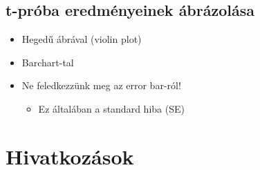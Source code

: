 \documentclass[
  letterpaper,
  DIV=11,
  numbers=noendperiod]{scrreprt}
\providecommand{\tightlist}{%
  \setlength{\itemsep}{0pt}\setlength{\parskip}{0pt}}\usepackage{longtable,booktabs,array}
\newlength{\cslhangindent}
\newlength{\cslentryspacingunit} %
\newenvironment{CSLReferences}[2] %
 {%
  \setlength{\parindent}{0pt}
  \ifodd #1
  \let\oldpar\par
  \def\par{\hangindent=\cslhangindent\oldpar}
  \fi
  \setlength{\parskip}{#2\cslentryspacingunit}
 }%
 {}
\begin{document}
\hypertarget{t-pruxf3ba-eredmuxe9nyeinek-uxe1bruxe1zoluxe1sa}{%
\section{t-próba eredményeinek
ábrázolása}\label{t-pruxf3ba-eredmuxe9nyeinek-uxe1bruxe1zoluxe1sa}}

\begin{itemize}
\item
  Hegedű ábrával (violin plot)
\item
  Barchart-tal
\item
  Ne feledkezzünk meg az error bar-ról!

  \begin{itemize}
  \tightlist
  \item
    Ez általában a standard hiba (SE)
  \end{itemize}
\end{itemize}


\hypertarget{hivatkozuxe1sok}{%
\chapter*{Hivatkozások}\label{hivatkozuxe1sok}}


\hypertarget{refs}{}
\begin{CSLReferences}{0}{0}
\end{CSLReferences}
\end{document}

